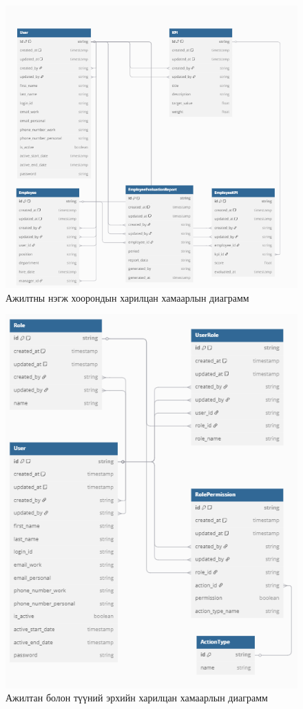 \begin{figure}[H]
    \centering
    \includegraphics[scale=0.8]{src/images/diagram/employeeErd.png}
    \caption{Ажилтны нэгж хоорондын харилцан хамаарлын диаграмм}
    \label{fig:employee_erd}
\end{figure}
\begin{figure}[H]
    \centering
    \includegraphics[scale=0.8]{src/images/diagram/userRoleErd.png}
    \caption{Ажилтан болон түүний эрхийн харилцан хамаарлын диаграмм}
    \label{fig:user_role_erd}
\end{figure}

